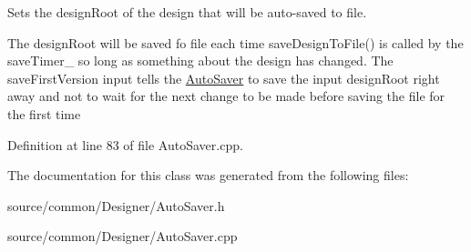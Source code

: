 Sets the design\-Root of the design that will be auto-\/saved to file. 

The design\-Root will be saved fo file each time save\-Design\-To\-File() is called by the save\-Timer\-\_\- so long as something about the design has changed. The save\-First\-Version input tells the \hyperlink{class_picto_1_1_auto_saver}{Auto\-Saver} to save the input design\-Root right away and not to wait for the next change to be made before saving the file for the first time 

Definition at line 83 of file Auto\-Saver.\-cpp.



The documentation for this class was generated from the following files\-:\begin{DoxyCompactItemize}
\item 
source/common/\-Designer/Auto\-Saver.\-h\item 
source/common/\-Designer/Auto\-Saver.\-cpp\end{DoxyCompactItemize}
